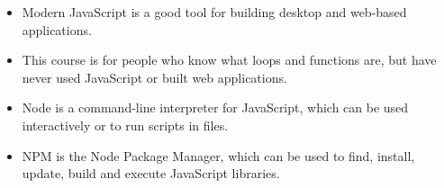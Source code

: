 \begin{itemize}
\item
  Modern JavaScript is a good tool for building desktop and web-based applications.
\item
  This course is for people who know what loops and functions are, but have never used JavaScript or built web applications.
\item
  Node is a command-line interpreter for JavaScript, which can be used interactively or to run scripts in files.
\item
  NPM is the Node Package Manager, which can be used to find, install, update, build and execute JavaScript libraries.
\end{itemize}

